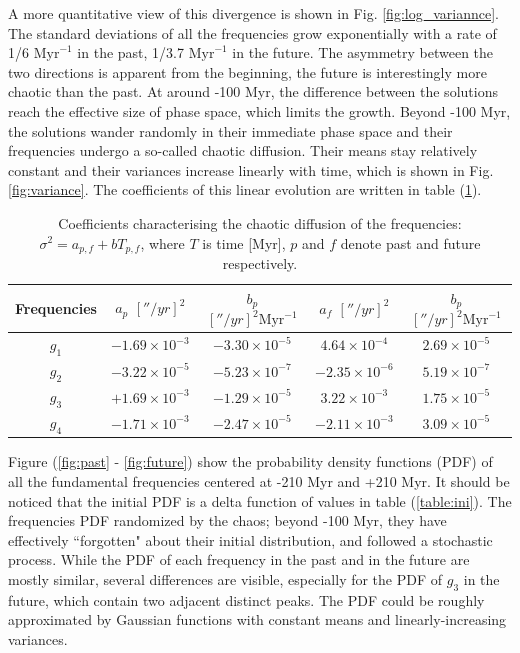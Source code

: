 \documentclass[12pt]{article}
\begin{document}
	A more quantitative view of this divergence is shown in Fig. \ref{fig:log_variannce}. The standard deviations of all the frequencies grow exponentially with a rate of 1/6 $\text{Myr}^{-1}$ in the past, 1/3.7  $\text{Myr}^{-1}$ in the future. The asymmetry between the two directions is apparent from the beginning, the future is interestingly more chaotic than the past.
	At around -100 Myr, the difference between the solutions reach the effective size of phase space, which limits the growth. Beyond -100 Myr, the solutions wander randomly in their immediate phase space and their frequencies undergo a so-called chaotic diffusion. Their means stay relatively constant and their variances increase linearly with time, which is shown in Fig. \ref{fig:variance}.  The coefficients of this linear evolution are written in table (\ref{table:sigma2}).
	
	\begin{table}[ht]
		\centering
		
		\begin{tabular}[t]{ccccc}
			\toprule
			Frequencies & $a_p$ $[''/yr]^2$ & $b_p$ $[''/yr]^2 \text{Myr}^{-1}$   & $a_f$ $[''/yr]^2$ & $b_p$ $[''/yr]^2 \text{Myr}^{-1}$\\
			\midrule
			$g_1$& $-1.69 \times 10^{-3}$ & $-3.30 \times 10^{-5}$ & $4.64 \times 10^{-4}$ & $ 2.69 \times 10^{-5}$\\
			$g_2$& $-3.22  \times 10^{-5}$ &$-5.23 \times 10^{-7}$ & $-2.35 \times 10^{-6}$ & $ 5.19 \times 10^{-7}$\\
			$g_3$& $+1.69 \times 10^{-3}$ & $-1.29 \times 10^{-5}$ & $3.22 \times 10^{-3}$ & $ 1.75 \times 10^{-5}$\\
			$g_4$& $-1.71 \times 10^{-3}$ & $-2.47 \times 10^{-5}$ & $-2.11 \times 10^{-3}$ & $3.09 \times 10^{-5}$\\        
			\bottomrule
		\end{tabular}
		\caption{Coefficients characterising the chaotic diffusion of the frequencies: $\sigma^2 = a_{p,f} + bT_{p,f}$, where $T$ is time [Myr], $p$ and $f$ denote past and future respectively.}
		\label{table:sigma2}
	\end{table}
	
	Figure (\ref{fig:past} - \ref{fig:future})  show the probability density functions (PDF) of all the fundamental frequencies centered at -210 Myr and +210 Myr. It should be noticed that the initial PDF is a delta function of values in table (\ref{table:ini}). The frequencies PDF randomized by the chaos; beyond -100 Myr, they have effectively ``forgotten" about their initial distribution, and followed a stochastic process. 
	While the PDF of each frequency in the past and in the future are mostly similar, several differences are visible, especially for the PDF of $g_3$ in the future, which contain two adjacent distinct peaks. The PDF could be roughly approximated by Gaussian functions with constant means and linearly-increasing variances. 
	
\end{document}
